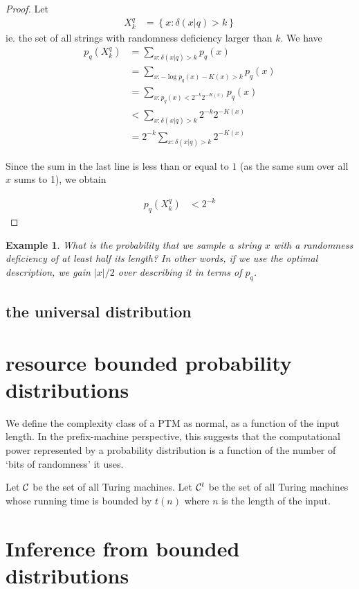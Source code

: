 \documentclass[10pt,a4paper,oneside]{article}
\newtheorem{exm}{Example}
\begin{document}
\begin{proof}
Let 
\begin{align*}
X_k^q &= \left\{x : \delta(x|q) > k \right\}
\end{align*}
ie. the set of all strings with randomness deficiency larger than $k$. We have 
\begin{align*}
p_q(X_k^q) &= \sum_{x:\delta(x|q)>k}p_q(x)\\
    &= \sum_{x: -\log p_q(x) - K(x) > k}p_q(x)\\
    &= \sum_{x:  p_q(x) < 2^{-k}2^{-K(x)}} p_q(x)\\
    &< \sum_{x:\delta(x|q) > k} 2^{-k} 2^{-K(x)}\\
    &= 2^{-k}\sum_{x:\delta(x|q) > k} 2^{-K(x)}
\end{align*}

Since the sum in the last line is less than or equal to $1$ (as the same sum over all $x$ sums to 1), we obtain

\begin{align*}
p_q(X_k^q) &< 2^{-k}
\end{align*}
\end{proof}

\begin{exm}
What is the probability that we sample a string $x$ with a randomness deficiency of at least half its length? In other words, if we use the optimal description, we gain $|x|/2$ over describing it in terms of $p_q$.
\end{exm} 

\subsection*{the universal distribution}

\section*{resource bounded probability distributions}

We define the complexity class of a PTM as normal, as a function of the input length. In the prefix-machine perspective, this suggests that the computational power represented by a probability distribution is a function of the number of `bits of randomness' it uses.

Let $\cal C$ be the set of all Turing machines. Let ${\cal C}^t$ be the set of all Turing machines whose running time is bounded by $t(n)$ where $n$ is the length of the input.



\subsection*{}

\section*{Inference from bounded distributions}
\nocite{*}


\end{document}
